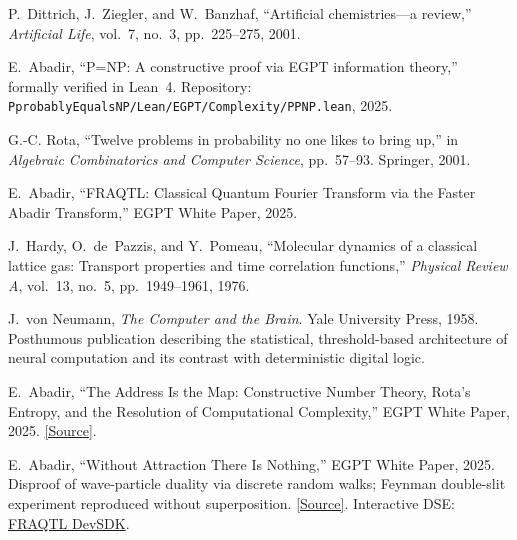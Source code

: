 \documentclass[11pt,a4paper]{article}
\begin{document}
\begin{enumerate}[label={[\arabic*]}, leftmargin=*, itemsep=2pt]
    \item \label{ref:dittrich} P.~Dittrich, J.~Ziegler, and W.~Banzhaf, ``Artificial chemistries---a review,'' \emph{Artificial Life}, vol.~7, no.~3, pp.~225--275, 2001.

    \item \label{ref:PPNP} E.~Abadir, ``P=NP: A constructive proof via EGPT information theory,'' formally verified in Lean~4. Repository: \texttt{PprobablyEqualsNP/Lean/EGPT/Complexity/PPNP.lean}, 2025.

    \item \label{ref:rota} G.-C. Rota, ``Twelve problems in probability no one likes to bring up,'' in \emph{Algebraic Combinatorics and Computer Science}, pp.~57--93. Springer, 2001.

    \item \label{ref:fraqtl} E.~Abadir, ``FRAQTL: Classical Quantum Fourier Transform via the Faster Abadir Transform,'' EGPT White Paper, 2025.

    \item \label{ref:hardy} J.~Hardy, O.~de~Pazzis, and Y.~Pomeau, ``Molecular dynamics of a classical lattice gas: Transport properties and time correlation functions,'' \emph{Physical Review A}, vol.~13, no.~5, pp.~1949--1961, 1976.

    \item \label{ref:vonneumann_brain} J.~von Neumann, \emph{The Computer and the Brain}. Yale University Press, 1958. Posthumous publication describing the statistical, threshold-based architecture of neural computation and its contrast with deterministic digital logic.

    \item \label{ref:address_map} E.~Abadir, ``The Address Is the Map: Constructive Number Theory, Rota's Entropy, and the Resolution of Computational Complexity,'' EGPT White Paper, 2025. \href{https://eabadir.github.io/EGPT/content/Papers/Address_Is_The_Map/Address_Is_The_Map.tex}{[Source]}.

    \item \label{ref:without_attraction} E.~Abadir, ``Without Attraction There Is Nothing,'' EGPT White Paper, 2025. Disproof of wave-particle duality via discrete random walks; Feynman double-slit experiment reproduced without superposition. \href{https://eabadir.github.io/EGPT/content/Papers/Without_Attraction_There_Is_Nothing/Without_Attraction_There_Is_Nothing.tex}{[Source]}. Interactive DSE: \href{https://eabadir.github.io/EGPT/www/fraqtl_devsdk/index.html}{FRAQTL DevSDK}.


\end{enumerate}
\end{document}
